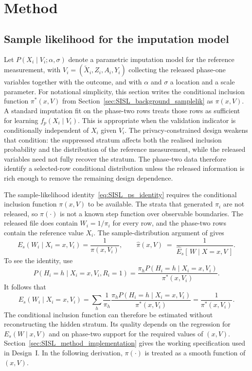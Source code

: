  
\section{Method}
\label{sec:SISLmethod}
 
\subsection{Sample likelihood for the imputation model}
\label{sec:SISL_method_samplelik}
 
Let $P(X_i \mid V_i;\alpha,\sigma)$ denote a parametric imputation model for the reference measurement, with $V_i = (\tilde{X}_i, Z_i, A_i, Y_i)$ collecting the released phase-one variables together with the outcome, and with $\alpha$ and $\sigma$ a location and a scale parameter. For notational simplicity, this section writes the conditional inclusion function $\pi^*(x,V)$ from Section~\ref{sec:SISL_background_samplelik} as $\pi(x,V)$. A standard imputation fit on the phase-two rows treats those rows as sufficient for learning $f_p(X_i\mid V_i)$. This is appropriate when the validation indicator is conditionally independent of $X_i$ given $V_i$. The privacy-constrained design weakens that condition: the suppressed stratum affects both the realised inclusion probability and the distribution of the reference measurement, while the released variables need not fully recover the stratum. The phase-two data therefore identify a selected-row conditional distribution unless the released information is rich enough to remove the remaining design dependence.

The sample-likelihood identity~\eqref{eq:SISL_ps_identity} requires the conditional inclusion function $\pi(x,V)$ to be available. The strata that generated $\pi_i$ are not released, so $\pi(\cdot)$ is not a known step function over observable boundaries. The released file does contain $W_i = 1/\pi_i$ for every row, and the phase-two rows contain the reference value $X_i$. The sample-distribution argument of \citet{pfeffermann1999parametric} gives
\begin{equation}
E_s(W_i\mid X_i=x,V_i)=\frac{1}{\pi(x,V_i)},
\qquad
\hat{\pi}(x, V) \;=\; \frac{1}{\hat{E}_s\!\left[\,W \mid X = x, V\,\right]}.
\label{eq:SISL_pi_est}
\end{equation}
To see the identity, use
\[
P(H_i=h\mid X_i=x,V_i,R_i=1)
=\frac{\pi_hP(H_i=h\mid X_i=x,V_i)}{\pi^*(x,V_i)}.
\]
It follows that
\[
E_s(W_i\mid X_i=x,V_i)
=\sum_h\frac{1}{\pi_h}
  \frac{\pi_hP(H_i=h\mid X_i=x,V_i)}{\pi^*(x,V_i)}
=\frac{1}{\pi^*(x,V_i)}.
\]
The conditional inclusion function can therefore be estimated without reconstructing the hidden stratum. Its quality depends on the regression for $E_s(W\mid x,V)$ and on phase-two support for the required values of $(x,V)$. Section~\ref{sec:SISL_method_implementation} gives the working specification used in Design~I. In the following derivation, $\pi(\cdot)$ is treated as a smooth function of $(x,V)$.
 
